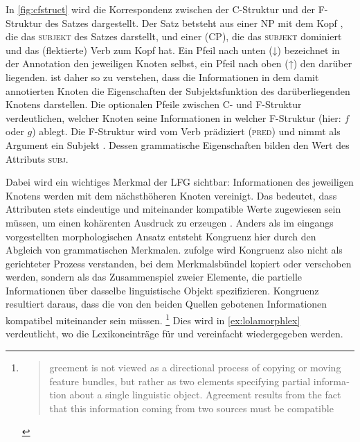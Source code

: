 In \cref{fig:cfstruct} wird die Korrespondenz zwischen der C-Struktur und der
F-Struktur des Satzes  dargestellt. Der Satz betsteht aus einer
NP mit dem Kopf , die das \textsc{subjekt} des Satzes darstellt, und
einer  (CP), die das \textsc{subjekt} dominiert und
das (flektierte) Verb  zum Kopf hat. Ein Pfeil nach unten (↓)
bezeichnet in der Annotation den jeweiligen Knoten selbst, ein Pfeil nach oben
(↑) den darüber liegenden.  ist daher so zu verstehen, dass die
Informationen in dem damit annotierten Knoten die Eigenschaften der
Subjekts\-funk\-tion des darüberliegenden Knotens darstellen. Die optionalen
Pfeile zwischen C- und F-Struktur verdeutlichen, welcher Knoten seine
Informationen in welcher F-Struktur (hier: $f$ oder $g$) ablegt. Die F-Struktur
wird vom Verb  prädiziert (\textsc{pred}) und nimmt als Argument ein
Subjekt . Dessen grammatische Eigenschaften bilden den Wert des
Attributs \textsc{subj}.

Dabei wird ein wichtiges Merkmal der LFG sichtbar: Informationen des jeweiligen
Knotens werden mit dem nächsthöheren Knoten vereinigt. Das bedeutet, dass
Attributen stets eindeutige und miteinander kompatible Werte zugewiesen sein
müssen, um einen kohärenten Ausdruck zu erzeugen
\autocite[vgl.][43--54]{bresnanetal2016}. Anders als im eingangs vorgestellten
morphologischen Ansatz entsteht Kongruenz hier durch den Abgleich von
grammatischen Merkmalen. \citet[7]{wechslerzlatic2003} zufolge wird Kongruenz
also nicht als gerichteter Prozess verstanden, bei dem Merkmalsbündel kopiert
oder verschoben werden, sondern als das Zusammenspiel zweier Elemente, die
partielle Informationen über dasselbe linguistische Objekt spezifizieren.
Kongruenz resultiert daraus, dass die von den beiden Quellen gebotenen
Informationen kompatibel miteinander sein müssen.%
%
	\footnote{\foreignblockcquote{english}[7]{wechslerzlatic2003}{%
		greement is not viewed as a directional process of copying
		or moving feature bundles, but rather as two elements specifying
		partial information about a single linguistic object. Agreement results
		from the fact that this information coming from two sources must be
		compatible}.
	}
%
Dies wird in \cref{ex:lolamorphlex} verdeutlicht, wo die Lexikoneinträge für
 und  vereinfacht wiedergegeben werden.

